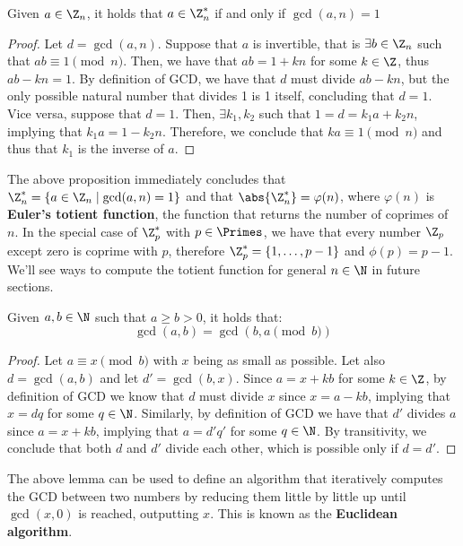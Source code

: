 \documentclass[a4paper, 12pt]{report}
\begin{document}
    \begin{framedprop}{}
        Given $a \in \Z_n$, it holds that $a \in \Z_n^*$ if and only if $\gcd(a,n) = 1$
    \end{framedprop}

    \begin{proof}
        Let $d = \gcd(a,n)$. Suppose that $a$ is invertible, that is $\exists b \in \Z_n$ such that $ab \equiv 1 \pmod n$. Then, we have that $ab = 1+kn$ for some $k \in \Z$, thus $ab - kn = 1$. By definition of GCD, we have that $d$ must divide $ab - kn$, but the only possible natural number that divides 1 is 1 itself, concluding that $d = 1$. Vice versa, suppose that $d = 1$. Then, $\exists k_1,k_2$ such that $1 = d = k_1a + k_2n$, implying that $k_1a = 1- k_2n$. Therefore, we conclude that $ka \equiv 1 \pmod n$ and thus that $k_1$ is the inverse of $a$. 
    \end{proof}

    The above proposition immediately concludes that $\Z_n^* = \{a \in \Z_n \mid \gcd(a,n) = 1\}$ and that $\abs{\Z_n^*} = \varphi(n)$, where $\varphi(n)$ is \textbf{Euler's totient function}, the function that returns the number of coprimes of $n$. In the special case of $\Z_p^*$ with $p \in \Primes$, we have that every number $\Z_p$ except zero is coprime with $p$, therefore $\Z_p^* = \{1, \ldots, p-1\}$ and $\phi(p) = p-1$. We'll see ways to compute the totient function for general $n \in \N$ in future sections.

    \begin{framedlem}{}
        Given $a,b \in \N$ such that $a \geq b > 0$, it holds that:
        \[\gcd(a,b) = \gcd(b, a \pmod b)\]
    \end{framedlem}

    \begin{proof}
        Let $a \equiv x \pmod b$ with $x$ being as small as possible. Let also $d = \gcd(a,b)$ and let $d' = \gcd(b,x)$. Since $a = x + kb$ for some $k \in \Z$, by definition of GCD we know that $d$ must divide $x$ since $x = a-kb$, implying that $x = dq$ for some $q \in \N$. Similarly, by definition of GCD we have that $d'$ divides $a$ since $a = x+kb$, implying that $a = d'q'$ for some $q \in \N$. By transitivity, we conclude that both $d$ and $d'$ divide each other, which is possible only if $d = d'$.
    \end{proof}

    The above lemma can be used to define an algorithm that iteratively computes the GCD between two numbers by reducing them little by little up until $\gcd(x, 0)$ is reached, outputting $x$. This is known as the \textbf{Euclidean algorithm}.
    
\end{document}
